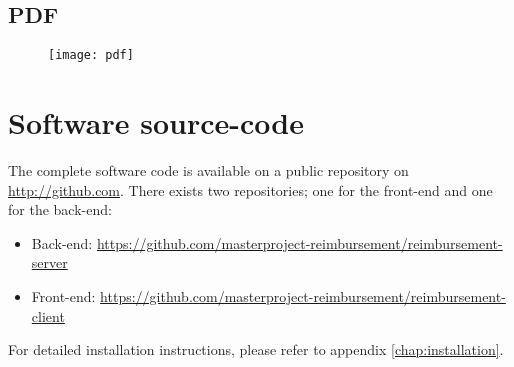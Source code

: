 \section{PDF}
\label{sec:app-pdf}

\begin{figure}[H]
    {\texttt{[image: pdf]}}
\end{figure}

\chapter{Software source-code}

The complete software code is available on a public repository on \url{http://github.com}. There exists two repositories; one for the front-end and one for the back-end:

\begin{itemize}
\item Back-end: \newline \url{https://github.com/masterproject-reimbursement/reimbursement-server}
\item Front-end: \newline \url{https://github.com/masterproject-reimbursement/reimbursement-client}
\end{itemize}

For detailed installation instructions, please refer to appendix \ref{chap:installation}. 
